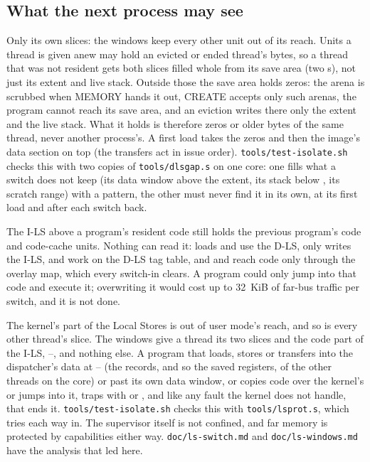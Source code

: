 \subsection{What the next process may see}\label{sec:os-isolate}

Only its own slices: the windows keep every other unit out of its reach. Units a thread is given anew
may hold an evicted or ended thread's bytes, so a thread that was not resident gets both slices filled
whole from its save area (two s), not just its extent and live stack. Outside those the save
area holds zeros: the arena is scrubbed when MEMORY hands it out, CREATE accepts only such arenas, the
program cannot reach its save area, and an eviction writes there only the extent and the live stack.
What it holds is therefore zeros or older bytes of the same thread, never another process's. A first
load takes the zeros and then the image's data section on top (the transfers act in issue order).
\texttt{tools/test-isolate.sh} checks this with two copies of \texttt{tools/dlsgap.s} on one core: one
fills what a switch does not keep (its data window above the extent, its stack below , its
scratch range) with a pattern, the other must never find it in its own, at its first load and after
each switch back.

The I-LS above a program's resident code still holds the previous program's code and code-cache units.
Nothing can read it: loads and  use the D-LS,  only writes the I-LS, 
and  work on the D-LS tag table, and  and  reach code only through
the overlay map, which every switch-in clears. A program could only jump into that code and execute it;
overwriting it would cost up to 32~KiB of far-bus traffic per switch, and it is not done.

The kernel's part of the Local Stores is out of user mode's reach, and so is every other thread's
slice. The windows give a thread its two slices and the code part of the I-LS, --,
and nothing else. A program that loads, stores or transfers into the dispatcher's data at
-- (the records, and so the saved registers, of the other threads on the core) or past
its own data window, or copies code over the kernel's or jumps into it, traps with  or
, and like any fault the kernel does not handle, that ends it.
\texttt{tools/test-isolate.sh} checks this with \texttt{tools/lsprot.s}, which tries each way in. The
supervisor itself is not confined, and far memory is protected by capabilities either way.
\texttt{doc/ls-switch.md} and \texttt{doc/ls-windows.md} have the analysis that led here.

